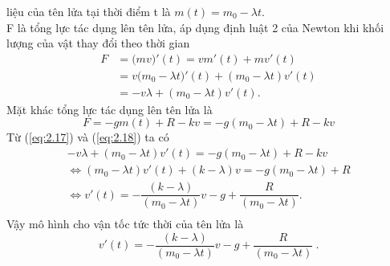 liệu của tên lửa tại thời điểm t là $m(t)={{m}_{0}}-\lambda t$. \\
F là tổng lực tác dụng lên tên lửa, áp dụng định luật 2 của Newton khi khối lượng của vật thay đổi theo thời gian                             
\begin{equation}
	\begin{array}{ll}
	 F&=(mv{)}'(t)=v{m}'(t)+m{v}'(t) \\ 
	&=v({{m}_{0}}-\lambda t{)}'(t)+({{m}_{0}}-\lambda t){v}'(t) \\ 
	 &=-v\lambda +({{m}_{0}}-\lambda t){v}'(t).
\end{array}
\label{eq:2.17}
\end{equation}
Mặt khác tổng lực tác dụng lên tên lửa là
\begin{equation}
	F=-gm(t)+R-kv=-g({{m}_{0}}-\lambda t)+R-kv
\label{eq:2.18}
\end{equation}
Từ (\ref{eq:2.17}) và (\ref{eq:2.18}) ta có
\[\begin{array}{l}
	 -v\lambda +({{m}_{0}}-\lambda t)v'(t)=-g({{m}_{0}}-\lambda t)+R-kv \\ 
	 \Leftrightarrow ({{m}_{0}}-\lambda t)v'(t)+(k-\lambda )v=-g({{m}_{0}}-\lambda t)+R \\ 
	 \Leftrightarrow v'(t)=-\dfrac{(k-\lambda )}{({{m}_{0}}-\lambda t)}v-g+\dfrac{R}{({{m}_{0}}-\lambda t)}. \\ 
\end{array}\]
Vậy mô hình cho vận tốc tức thời của tên lửa là 
\begin{equation}
	v'(t)=-\dfrac{(k-\lambda )}{({{m}_{0}}-\lambda t)}v-g+\dfrac{R}{({{m}_{0}}-\lambda t)} \ .
\label{eq:2.19}
\end{equation}
